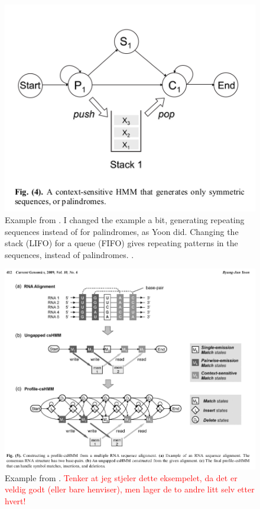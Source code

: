 \documentclass{article}\usepackage[]{graphicx}\usepackage[]{color}
\begin{document}
\begin{figure}
    \centering
    \includegraphics[width = \textwidth]{ExampleYooncsHMM.png}
    \caption{Example from \cite{Yoon2009}. I changed the example a bit, generating repeating sequences instead of for palindromes, as Yoon did.  Changing the stack (LIFO) for a queue (FIFO) gives repeating patterns in the sequences, instead of palindromes. .}
    \label{fig:Yoon2009ContextSensitiveHMMExample}
\end{figure}

\begin{figure}
    \centering
    \includegraphics[width = \textwidth]{contextSensHMMExampleYoon.png}
    \caption{Example from \cite{Yoon2009}. \textcolor{red}{Tenker at jeg stjeler dette eksempelet, da det er veldig godt (eller bare henviser), men lager de to andre litt selv etter hvert!}}
    \label{fig:Yoon2009ProfileContextSensitiveHMMExample}
\end{figure}
\end{document}
